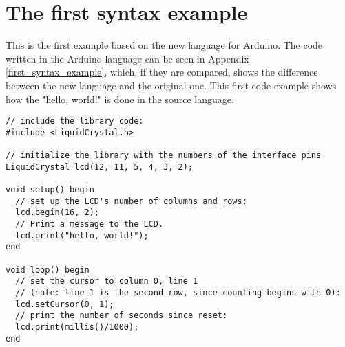 \section{The first syntax example}
This is the first example based on the new language for Arduino. The code written in the Arduino language can be seen in Appendix \ref{first_syntax_example}, which, if they are compared, shows the difference between the new language and the original one. This first code example shows how the "hello, world!" is done in the source language. 
\begin{lstlisting}[caption=Hello World code example based on the source language, label=lst:syntax1]
// include the library code:
#include <LiquidCrystal.h>

// initialize the library with the numbers of the interface pins
LiquidCrystal lcd(12, 11, 5, 4, 3, 2);

void setup() begin
  // set up the LCD's number of columns and rows: 
  lcd.begin(16, 2);
  // Print a message to the LCD.
  lcd.print("hello, world!");
end

void loop() begin
  // set the cursor to column 0, line 1
  // (note: line 1 is the second row, since counting begins with 0):
  lcd.setCursor(0, 1);
  // print the number of seconds since reset:
  lcd.print(millis()/1000);
end
\end{lstlisting}
